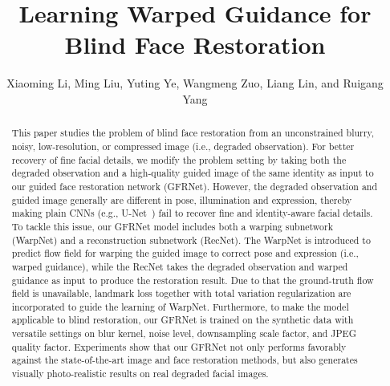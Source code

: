 \documentclass[runningheads]{llncs}
\begin{document}
\pagestyle{headings}
\mainmatter
\def\ECCV18SubNumber{399}  

\title{Learning Warped Guidance for Blind Face Restoration} 

\titlerunning{}

\author{Xiaoming Li, Ming Liu, Yuting Ye, Wangmeng Zuo\Envelope, Liang Lin, \newline and Ruigang Yang}
\maketitle
\begin{abstract}
This paper studies the problem of blind face restoration from an unconstrained blurry, noisy, low-resolution, or compressed image (i.e., degraded observation).
For better recovery of fine facial details, we modify the problem setting by taking both the degraded observation and a high-quality guided image of the same identity as input to our guided face restoration network (GFRNet).
However, the degraded observation and guided image generally are different in pose, illumination and expression, thereby making plain CNNs (e.g., U-Net~\cite{ronneberger2015u}) fail to recover fine and identity-aware facial details.
To tackle this issue, our GFRNet model includes both a warping subnetwork (WarpNet) and a reconstruction subnetwork (RecNet).
The WarpNet is introduced to predict flow field for warping the guided image to correct pose and expression (i.e., warped guidance),
while the RecNet takes the degraded observation and warped guidance as input to produce the restoration result.
Due to that the ground-truth flow field is unavailable, landmark loss together with total variation regularization are incorporated to guide the learning of WarpNet.
Furthermore, to make the model applicable to blind restoration, our GFRNet is trained on the synthetic data with versatile settings on blur kernel, noise level, downsampling scale factor, and JPEG quality factor.
Experiments show that our GFRNet not only performs favorably against the state-of-the-art image and face restoration methods, but also generates visually photo-realistic results on real degraded facial images.

\end{abstract}
\end{document}
